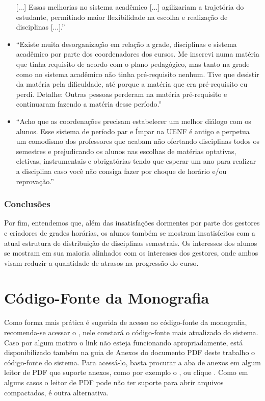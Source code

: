 \begin{apendicesenv}
\begin{itemize}
          [...]
          Essas melhorias no sistema acadêmico [...] agilizariam a trajetória do estudante, permitindo maior flexibilidade na escolha e realização de disciplinas [...].''
    \item ``Existe muita desorganização em relação a grade, disciplinas e sistema acadêmico por parte dos coordenadores dos cursos. Me inscrevi numa matéria que tinha requisito de acordo com o plano pedagógico, mas tanto na grade como no sistema acadêmico não tinha pré-requisito nenhum. Tive que desistir da matéria pela dificuldade, até porque a matéria que era pré-requisito eu perdi. Detalhe: Outras pessoas perderam na matéria pré-requisito e continuaram fazendo a matéria desse período.''
    \item ``Acho que as coordenações precisam estabelecer um melhor diálogo com os alunos. Esse sistema de período par e Ímpar na UENF é antigo e perpetua um comodismo dos professores que acabam não ofertando disciplinas todos os semestres e prejudicando os alunos nas escolhas de matérias optativas, eletivas, instrumentais e obrigatórias tendo que esperar um ano para realizar a disciplina caso você não consiga fazer por choque de horário e/ou reprovação.''
  \end{itemize}

  \subsection{Conclusões} %

  Por fim, entendemos que, além das insatisfações dormentes por parte dos gestores e criadores de grades horárias, os alunos também se mostram insatisfeitos com a atual estrutura de distribuição de disciplinas semestrais. Os interesses dos alunos se mostram em sua maioria alinhados com os interesses dos gestores, onde ambos visam reduzir a quantidade de atrasos na progressão do curso.

  \chapter{Código-Fonte da Monografia} \label{apendice:CodigoFonte}

  Como forma mais prática é sugerida de acesso ao código-fonte da monografia, recomenda-se acessar o , nele constará o código-fonte mais atualizado do sistema. Caso por algum motivo o link não esteja funcionando apropriadamente, está disponibilizado também na guia de Anexos do documento PDF deste trabalho o código-fonte do sistema. Para acessá-lo, basta procurar a aba de anexos em algum leitor de PDF que suporte anexos, como por exemplo o , ou clique . Como em alguns casos o leitor de PDF pode não ter suporte para abrir arquivos compactados,  é outra alternativa.


\end{apendicesenv}
